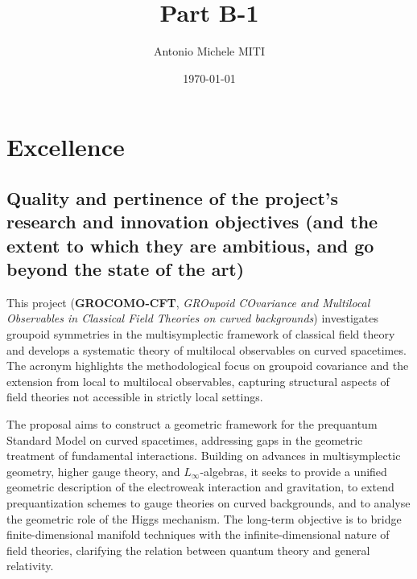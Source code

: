 \documentclass[11pt]{msca-pf}
\title{Part B-1}
\author{Antonio Michele MITI}
\date{\today}
\begin{document}
\maketitle


\section{Excellence }
\label{sc:excellence}


\subsection{Quality and pertinence of the project's research and innovation objectives
    (and the extent to which they are ambitious, and go beyond the state of the art)
    }
\label{ssc:excellence: quality}

This project (\textbf{GROCOMO-CFT}, \emph{GROupoid COvariance and Multilocal Observables in Classical Field Theories on curved backgrounds}) investigates groupoid symmetries in the multisymplectic framework of classical field theory and develops a systematic theory of multilocal observables on curved spacetimes. The acronym highlights the methodological focus on groupoid covariance and the extension from local to multilocal observables, capturing structural aspects of field theories not accessible in strictly local settings.

The proposal aims to construct a geometric framework for the prequantum Standard Model on curved spacetimes, addressing gaps in the geometric treatment of fundamental interactions. Building on advances in multisymplectic geometry, higher gauge theory, and $L_\infty$-algebras, it seeks to provide a unified geometric description of the electroweak interaction and gravitation, to extend prequantization schemes to gauge theories on curved backgrounds, and to analyse the geometric role of the Higgs mechanism. The long-term objective is to bridge finite-dimensional manifold techniques with the infinite-dimensional nature of field theories, clarifying the relation between quantum theory and general relativity.
\end{document}
